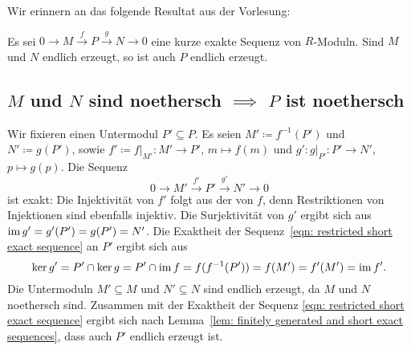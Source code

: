 \documentclass[a4paper,10pt,numbers=noenddot]{scrartcl}
\begin{document}
Wir erinnern an das folgende Resultat aus der Vorlesung:

\begin{lemma}
  \label{lem: finitely generated and short exact sequences}
  Es sei $0 \to M \xrightarrow{f} P \xrightarrow{g} N \to 0$ eine kurze exakte Sequenz von $R$-Moduln.
  Sind $M$ und $N$ endlich erzeugt, so ist auch $P$ endlich erzeugt.
\end{lemma}



\subsection*{$M$ und $N$ sind noethersch $\implies$ $P$ ist noethersch}

Wir fixieren einen Untermodul $P' \subseteq P$.
Es seien $M' \coloneqq f^{-1}(P')$ und $N' \coloneqq g(P')$, sowie $f' \coloneqq f|_{M'} \colon M' \to P'$, $m \mapsto f(m)$ und $g' \colon g|_{P'} \colon P' \to N'$, $p \mapsto g(p)$.
Die Sequenz
\begin{equation}
  \label{eqn: restricted short exact sequence}
  0 \to M' \xrightarrow{f'} P' \xrightarrow{g'} N' \to 0
\end{equation}
ist exakt:
Die Injektivität von $f'$ folgt aus der von $f$, denn Restriktionen von Injektionen sind ebenfalls injektiv.
Die Surjektivität von $g'$ ergibt sich aus $\operatorname{im} g' = g'(P') = g(P') = N'$.
Die Exaktheit der Sequenz~\eqref{eqn: restricted short exact sequence} an $P'$ ergibt sich aus
\[
    \ker g'
  = P' \cap \ker g
  = P' \cap \operatorname{im} f
  = f(f^{-1}(P'))
  = f(M')
  = f'(M')
  = \operatorname{im} f'.
\]
Die Untermoduln $M' \subseteq M$ und $N' \subseteq N$ sind endlich erzeugt, da $M$ und $N$ noethersch sind.
Zusammen mit der Exaktheit der Sequenz \eqref{eqn: restricted short exact sequence} ergibt sich nach Lemma~\ref{lem: finitely generated and short exact sequences}, dass auch $P'$ endlich erzeugt ist.
\end{document}
